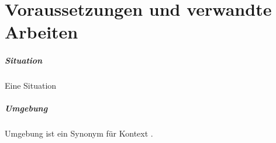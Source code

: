 \chapter{Voraussetzungen und verwandte Arbeiten}
\label{cha:requirements_and_related_work}





\paragraph{Situation}
Eine Situation 
\paragraph{Umgebung}
Umgebung ist ein Synonym für Kontext \cite{abowd_towards_1999}.

